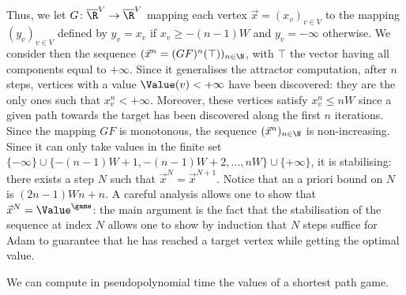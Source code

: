 Thus, we let $G\colon\overline\R^V\to\overline\R^V$ mapping each
vertex $\vec x = (x_v)_{v\in V}$ to the mapping $(y_v)_{v\in V}$
defined by $y_v = x_v$ if $x_v\geq -(n-1)W$ and $y_v=-\infty$
otherwise. We consider then the sequence
$(\vec x^n = (GF)^n(\top))_{n\in \N}$, with $\top$ the vector having
all components equal to $+\infty$. Since it generalises the attractor
computation, after $n$ steps, vertices with a value
$\Value(v)<+\infty$ have been discovered: they are the only ones such
that $x^{n}_v < +\infty$. Moreover, these vertices satisfy
$x^{n}_v\leq n W$ since a given path towards the target has been
discovered along the first $n$ iterations. Since the mapping $GF$ is
monotonous, the sequence $(\vec x^n)_{n\in \N}$ is
non-increasing. Since it can only take values in the finite set
$\{-\infty\}\cup \{-(n-1) W+1, -(n-1) W+2,\ldots,nW\}
\cup\{+\infty\}$, it is stabilising: there exists a step $N$ such that
$\vec x^N=\vec x^{N+1}$. Notice that an a priori bound on $N$ is
$(2n-1)W n + n$. A careful analysis allows one to show that
$\vec x^N=\Value^\game$: the main argument is the fact that the
stabilisation of the sequence at index $N$ allows one to show by
induction that $N$ steps suffice for Adam to guarantee that he has
reached a target vertex while getting the optimal value.

\begin{theorem}\label{4-thm:SP-pseudopoly-algo}
  We can compute in pseudopolynomial time the values of a
  shortest path game. 
\end{theorem}


